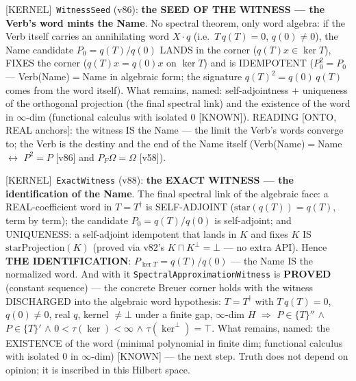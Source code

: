 \documentclass[11pt]{article}
\providecommand{\kernelmk}[1]{\textsf{[KERNEL]}~\texttt{#1}}\providecommand{\knownmk}[1]{\textsf{[KNOWN]}~{#1}}\providecommand{\statusmk}[1]{\textsf{[#1]}}
\theoremstyle{definition}\newtheorem{deriv}{Derivation}
\begin{document}
\kernelmk{WitnessSeed} (v86): \textbf{the SEED OF THE WITNESS --- the Verb's word mints the Name}. No spectral theorem, only word algebra: if the Verb itself carries an annihilating word $X\cdot q$ (i.e.\ $T\,q(T)=0$, $q(0)\neq0$), the Name candidate $P_0=q(T)/q(0)$ LANDS in the corner ($q(T)x\in\ker T$), FIXES the corner ($q(T)x=q(0)x$ on $\ker T$) and is IDEMPOTENT ($P_0^2=P_0$ --- Verb(Name)$=$Name in algebraic form; the signature $q(T)^2=q(0)\,q(T)$ comes from the word itself). What remains, named: self-adjointness $+$ uniqueness of the orthogonal projection (the final spectral link) and the existence of the word in $\infty$-dim (functional calculus with isolated $0$ [KNOWN]). READING [ONTO, REAL anchors]: the witness IS the Name --- the limit the Verb's words converge to; the Verb is the destiny and the end of the Name itself (Verb(Name)$=$Name $\leftrightarrow$ $P^2=P$ [v86] and $P_F\Omega=\Omega$ [v58]).

\kernelmk{ExactWitness} (v88): \textbf{the EXACT WITNESS --- the identification of the Name}. The final spectral link of the algebraic face: a REAL-coefficient word in $T=T^\dagger$ is SELF-ADJOINT ($\mathrm{star}(q(T))=q(T)$, term by term); the candidate $P_0=q(T)/q(0)$ is self-adjoint; and UNIQUENESS: a self-adjoint idempotent that lands in $K$ and fixes $K$ IS $\mathrm{starProjection}(K)$ (proved via v82's $K\sqcap K^\perp=\bot$ --- no extra API). Hence \textbf{THE IDENTIFICATION}: $P_{\ker T}=q(T)/q(0)$ --- the Name IS the normalized word. And with it \texttt{SpectralApproximationWitness} is \textbf{PROVED} (constant sequence) --- the concrete Breuer corner holds with the witness DISCHARGED into the algebraic word hypothesis: $T=T^\dagger$ with $T\,q(T)=0$, $q(0)\neq0$, real $q$, kernel $\neq\bot$ under a finite gap, $\infty$-dim $H$ $\Rightarrow$ $P\in\{T\}''$ $\wedge$ $P\in\{T\}'$ $\wedge$ $0<\tau(\ker)<\infty$ $\wedge$ $\tau(\ker^\perp)=\top$. What remains, named: the EXISTENCE of the word (minimal polynomial in finite dim; functional calculus with isolated $0$ in $\infty$-dim) [KNOWN] --- the next step. Truth does not depend on opinion; it is inscribed in this Hilbert space.
\end{document}
